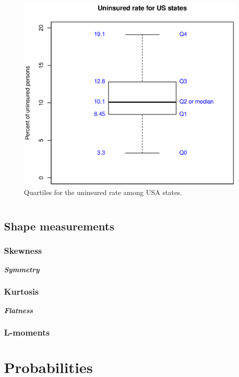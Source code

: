 \documentclass{report}
\newcommand{\notefor}[1]{\hfill\textbf{\textit{#1}}}
\begin{document}
		\begin{figure}[h]
			\centering
			\includegraphics[width=1.0\textwidth]{quartiles.eps}
			\caption{Quartiles for the uninsured rate among USA states.}
			\label{fig:queues}
		\end{figure}
		
		\begin{verbatim}
		\end{verbatim}
		
	\section{Shape measurements}
		\subsection{Skewness}
		\notefor{Symmetry}
		
		\subsection{Kurtosis}
		\notefor{Flatness}
		
		\subsection{L-moments}

\chapter{Probabilities}
\end{document}
